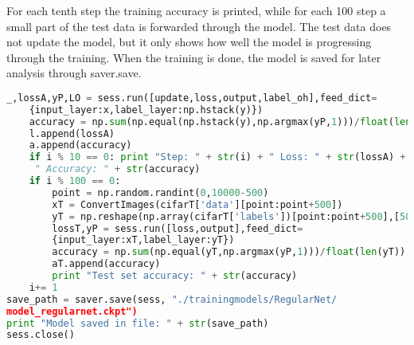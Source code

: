 For each tenth step the training accuracy is printed, while for each 100 step a small part of the test data is forwarded through the model. The test data does not update the model, but it only shows how well the model is progressing through the training. When the training is done, the model is saved for later analysis through saver.save.

\begin{lstlisting}[language=Python, label=lst:Parameter_updating, caption=Parameter updating: loss and accuracy are saved and they are tested every 100 steps]
	_,lossA,yP,LO = sess.run([update,loss,output,label_oh],feed_dict=
	{input_layer:x,label_layer:np.hstack(y)})
	accuracy = np.sum(np.equal(np.hstack(y),np.argmax(yP,1)))/float(len(y))
	l.append(lossA)
	a.append(accuracy)
	if i % 10 == 0: print "Step: " + str(i) + " Loss: " + str(lossA) +
	 " Accuracy: " + str(accuracy)
	if i % 100 == 0: 
		point = np.random.randint(0,10000-500)
		xT = ConvertImages(cifarT['data'][point:point+500]) 
		yT = np.reshape(np.array(cifarT['labels'])[point:point+500],[500])
		lossT,yP = sess.run([loss,output],feed_dict=
		{input_layer:xT,label_layer:yT})
		accuracy = np.sum(np.equal(yT,np.argmax(yP,1)))/float(len(yT))
		aT.append(accuracy)
		print "Test set accuracy: " + str(accuracy)
	i+= 1
save_path = saver.save(sess, "./trainingmodels/RegularNet/
model_regularnet.ckpt")
print "Model saved in file: " + str(save_path)
sess.close()
\end{lstlisting}



